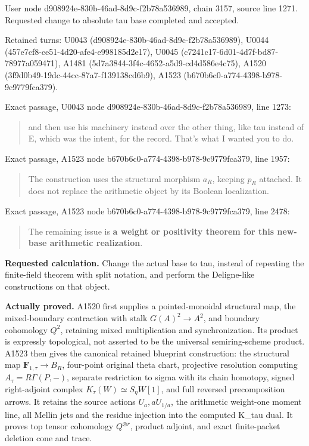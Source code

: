 User node d908924e-830b-46ad-8d9c-f2b78a536989, chain 3157, source line
1271. Requested change to absolute tau base completed and accepted.

Retained turns: U0043 (d908924e-830b-46ad-8d9c-f2b78a536989), U0044
(457e7cf8-ce51-4d20-afe4-e998185d2e17), U0045
(c7241c17-6d01-4d7f-bd87-78977a059471), A1481
(5d7a3844-3f4c-4652-a5d9-cd4d586e4c75), A1520
(3f9d0b49-19dc-44cc-87a7-f139138cd6b9), A1523
(b670b6c0-a774-4398-b978-9c9779fca379).

Exact passage, U0043 node d908924e-830b-46ad-8d9c-f2b78a536989, line
1273:

\begin{quote}
and then use his machinery instead over the other thing, like tau
instead of E, which was the intent, for the record. That's what I wanted
you to do.
\end{quote}

Exact passage, A1523 node b670b6c0-a774-4398-b978-9c9779fca379, line
1957:

\begin{quote}
The construction uses the structural morphism \(a_R\), keeping \(p_R\)
attached. It does not replace the arithmetic object by its Boolean
localization.
\end{quote}

Exact passage, A1523 node b670b6c0-a774-4398-b978-9c9779fca379, line
2478:

\begin{quote}
The remaining issue is \textbf{a weight or positivity theorem for this
new-base arithmetic realization}.
\end{quote}

\textbf{Requested calculation.} Change the actual base to tau, instead
of repeating the finite-field theorem with split notation, and perform
the Deligne-like constructions on that object.

\textbf{Actually proved.} A1520 first supplies a pointed-monoidal
structural map, the mixed-boundary contraction with stalk
\(G(A)^2\to A^2\), and boundary cohomology \(Q^2\), retaining mixed
multiplication and synchronization. Its product is expressly
topological, not asserted to be the universal semiring-scheme product.
A1523 then gives the canonical retained blueprint construction: the
structural map \(\mathbf F_{1,\tau}\to B_R\), four-point original theta
chart, projective resolution computing \(A_\tau=R\Gamma(P,-)\), separate
restriction to sigma with its chain homotopy, signed right-adjoint
complex \(K_\tau(W)\simeq S_\eta W[1]\), and full reversed
precomposition arrows. It retains the source actions \(U_a,aU_{1/a}\),
the arithmetic weight-one moment line, all Mellin jets and the residue
injection into the computed K\_tau dual. It proves top tensor cohomology
\(Q^{\otimes r}\), product adjoint, and exact finite-packet deletion
cone and trace.

